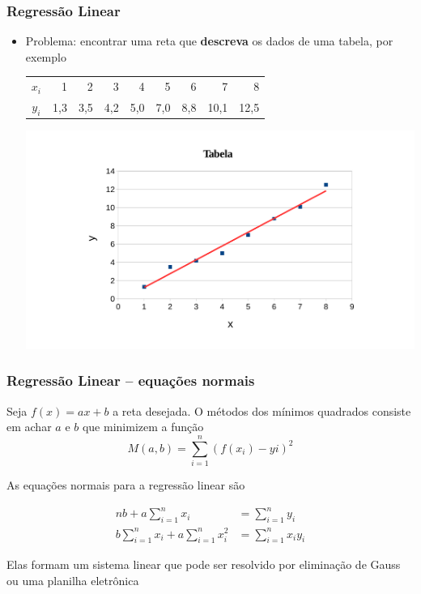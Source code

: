 \begin{frame}
\frametitle{Regressão Linear}

\begin{itemize}
\item Problema: encontrar uma reta que \textbf{descreva} os dados de uma tabela, por exemplo
\begin{center}
\begin{tabular}{c|rrrrrrrr}
\(x_i\) & 1 & 2 & 3 & 4 & 5 & 6 & 7 & 8 \\
\(y_i\) & 1,3 & 3,5 & 4,2 & 5,0 & 7,0 & 8,8 & 10,1 & 12,5 
\end{tabular}

\includegraphics[height=\textheight-75pt]{images/tab-2}
\end{center}
\end{itemize}
\end{frame}

\begin{frame}
\frametitle{Regressão Linear -- equações normais}
Seja \(f(x) = ax + b\) a reta desejada. O métodos dos mínimos quadrados consiste em achar \(a\) e \(b\) que minimizem a função
\[
M(a,b) = \sum_{i=1}^n {\left(f(x_i) - yi\right)^2}
\]

\pause

As equações normais para a regressão linear são

\begin{align*}
n b + a \sum_{i=1}^{n} {x_i} &= \sum_{i=1}^{n} {y_i} \\
b \sum_{i=1}^{n} {x_i} + a \sum_{i=1}^{n} {x_i^2} &= \sum_{i=1}^{n} {x_iy_i}
\end{align*}

Elas formam um sistema linear que pode ser resolvido por eliminação de Gauss ou uma planilha eletrônica

\end{frame}


